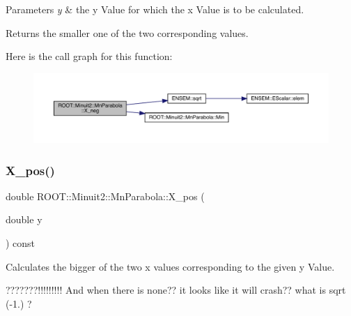 \begin{DoxyParams}{Parameters}
{\em y} & the y Value for which the x Value is to be calculated.\\
\hline
\end{DoxyParams}
\begin{DoxyReturn}{Returns}
the smaller one of the two corresponding values. 
\end{DoxyReturn}
Here is the call graph for this function\+:
\nopagebreak
\begin{figure}[H]
\begin{center}
\leavevmode
\includegraphics[width=350pt]{db/d7d/classROOT_1_1Minuit2_1_1MnParabola_a16f7f02dd1cb070e89fb007331066ee3_cgraph}
\end{center}
\end{figure}
\mbox{\label{classROOT_1_1Minuit2_1_1MnParabola_a2b4623df00488ca3d4175eb92123066e}} 
\subsubsection{\texorpdfstring{X\_pos()}{X\_pos()}\hspace{0.1cm}{\footnotesize\ttfamily [1/3]}}
{\footnotesize\ttfamily double R\+O\+O\+T\+::\+Minuit2\+::\+Mn\+Parabola\+::\+X\+\_\+pos (\begin{DoxyParamCaption}\item[{double}]{y }\end{DoxyParamCaption}) const\hspace{0.3cm}{\ttfamily [inline]}}

Calculates the bigger of the two x values corresponding to the given y Value.

???????!!!!!!!!! And when there is none?? it looks like it will crash?? what is sqrt (-\/1.) ?


